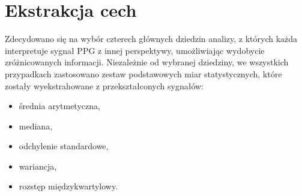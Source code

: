 \documentclass[a4paper,twoside,12pt]{book}
\begin{document}
\section{Ekstrakcja cech}
\label{Ekstrakcja cech}
Zdecydowano się na wybór czterech głównych dziedzin analizy, z których każda interpretuje sygnał PPG z innej perspektywy, umożliwiając wydobycie zróżnicowanych informacji. Niezależnie od wybranej dziedziny, we wszystkich przypadkach zastosowano zestaw podstawowych miar statystycznych, które zostały wyekstrahowane z przekształconych sygnałów:
\begin{itemize}
	\item średnia arytmetyczna,
	\item mediana,
	\item odchylenie standardowe,
	\item wariancja,
	\item rozstęp międzykwartylowy.
\end{itemize}
\end{document}
